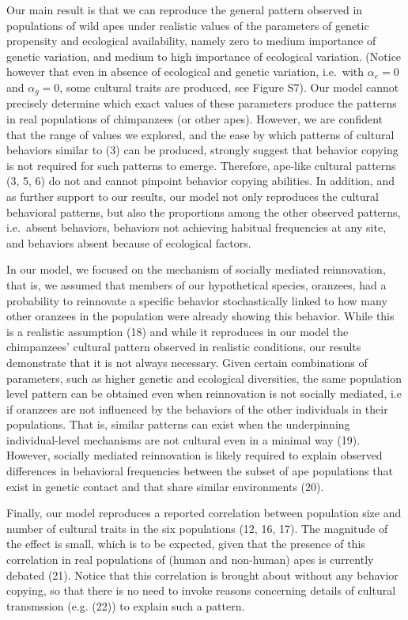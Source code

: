 \documentclass[9pt,twocolumn,twoside,]{pnas-new}
\begin{document}
Our main result is that we can reproduce the general pattern observed in
populations of wild apes under realistic values of the parameters of
genetic propensity and ecological availability, namely zero to medium
importance of genetic variation, and medium to high importance of
ecological variation. (Notice however that even in absence of ecological
and genetic variation, i.e.~with \(\alpha_e=0\) and \(\alpha_g=0\), some
cultural traits are produced, see Figure S7). Our model cannot precisely
determine which exact values of these parameters produce the patterns in
real populations of chimpanzees (or other apes). However, we are
confident that the range of values we explored, and the ease by which
patterns of cultural behaviors similar to (3) can be produced, strongly
suggest that behavior copying is not required for such patterns to
emerge. Therefore, ape-like cultural patterns (3, 5, 6) do not and
cannot pinpoint behavior copying abilities. In addition, and as further
support to our results, our model not only reproduces the cultural
behavioral patterns, but also the proportions among the other observed
patterns, i.e.~absent behaviors, behaviors not achieving habitual
frequencies at any site, and behaviors absent because of ecological
factors.

In our model, we focused on the mechanism of socially mediated
reinnovation, that is, we assumed that members of our hypothetical
species, oranzees, had a probability to reinnovate a specific behavior
stochastically linked to how many other oranzees in the population were
already showing this behavior. While this is a realistic assumption (18)
and while it reproduces in our model the chimpanzees' cultural pattern
observed in realistic conditions, our results demonstrate that it is not
always necessary. Given certain combinations of parameters, such as
higher genetic and ecological diversities, the same population level
pattern can be obtained even when reinnovation is not socially mediated,
i.e if oranzees are not influenced by the behaviors of the other
individuals in their populations. That is, similar patterns can exist
when the underpinning individual-level mechanisms are not cultural even
in a minimal way (19). However, socially mediated reinnovation is likely
required to explain observed differences in behavioral frequencies
between the subset of ape populations that exist in genetic contact and
that share similar environments (20).

Finally, our model reproduces a reported correlation between population
size and number of cultural traits in the six populations (12, 16, 17).
The magnitude of the effect is small, which is to be expected, given
that the presence of this correlation in real populations of (human and
non-human) apes is currently debated (21). Notice that this correlation
is brought about without any behavior copying, so that there is no need
to invoke reasons concerning details of cultural transmssion (e.g. (22))
to explain such a pattern.
\end{document}

